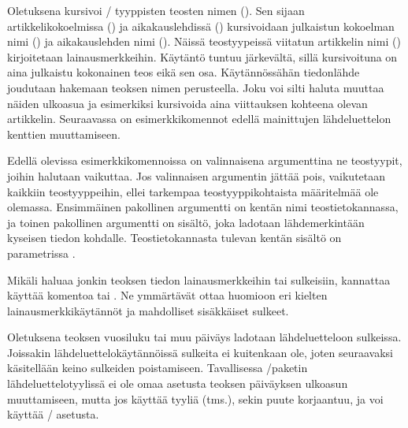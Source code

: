 Oletuksena  kursivoi \-/ tyyppisten
teosten nimen (). Sen sijaan artikkelikokoelmissa
() ja aikakauslehdissä ()
kursivoidaan julkaistun kokoelman nimi () ja
aikakauslehden nimi (). Näissä teostyypeissä
viitatun artikkelin nimi () kirjoitetaan lainausmerkkeihin.
Käytäntö tuntuu järkevältä, sillä kursivoituna on aina julkaistu
kokonainen teos eikä sen osa. Käytännössähän tiedonlähde joudutaan
hakemaan teoksen nimen perusteella. Joku voi silti haluta muuttaa näiden
ulkoasua ja esimerkiksi kursivoida aina viittauksen kohteena olevan
artikkelin. Seuraavassa on esimerkkikomennot edellä mainittujen
lähdeluettelon kenttien muuttamiseen.

\begin{koodilohkosis}
\end{koodilohkosis}

Edellä olevissa esimerkkikomennoissa on valinnaisena argumenttina ne
teostyypit, joihin halutaan vaikuttaa. Jos valinnaisen argumentin jättää
pois, vaikutetaan kaikkiin teostyyppeihin, ellei tarkempaa
teostyyppikohtaista määritelmää ole olemassa. Ensimmäinen pakollinen
argumentti on kentän nimi teostietokannassa, ja toinen pakollinen
argumentti on sisältö, joka ladotaan lähdemerkintään kyseisen tiedon
kohdalle. Teostietokannasta tulevan kentän sisältö on parametrissa
.

Mikäli haluaa jonkin teoksen tiedon lainausmerkkeihin tai sulkeisiin,
kannattaa käyttää komentoa  tai
. Ne ymmärtävät ottaa huomioon eri kielten
lainausmerkkikäytännöt ja mahdolliset sisäkkäiset sulkeet.

\begin{koodilohkosis}
\end{koodilohkosis}

Oletuksena teoksen vuosiluku tai muu päiväys ladotaan lähdeluetteloon
sulkeissa. Joissakin lähdeluettelokäytännöissä sulkeita ei kuitenkaan
ole, joten seuraavaksi käsitellään keino sulkeiden poistamiseen.
Tavallisessa \-/paketin lähdeluettelotyylissä
 ei ole omaa asetusta teoksen päiväyksen ulkoasun
muuttamiseen, mutta jos käyttää tyyliä  (tms.),
sekin puute korjaantuu, ja voi käyttää \-/
asetusta.

